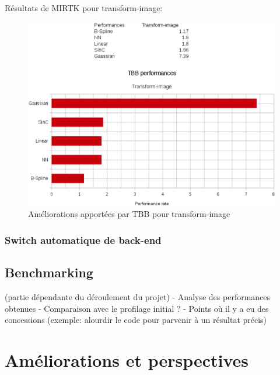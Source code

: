\documentclass[10pt]{report}
\begin{document}
Résultats de MIRTK pour transform-image:
	\begin{figure}[h!]
		\begin{center}
			\includegraphics[width=12cm]{Reports/figures/performances_tbb_transform_image.eps}
		\end{center}	
		\caption{Améliorations apportées par TBB pour transform-image}
		\label{Améliorations apportées par TBB pour transform-image}
	\end{figure}
	\subsection{Switch automatique de back-end}
	\section{Benchmarking}
	(partie dépendante du déroulement du projet)\newline
	- Analyse des performances obtenues \newline
	- Comparaison avec le profilage initial ? \newline
	- Points où il y a eu des concessions (exemple: alourdir le code pour parvenir à un résultat précis)
	
\chapter{Améliorations et perspectives}
\end{document}
